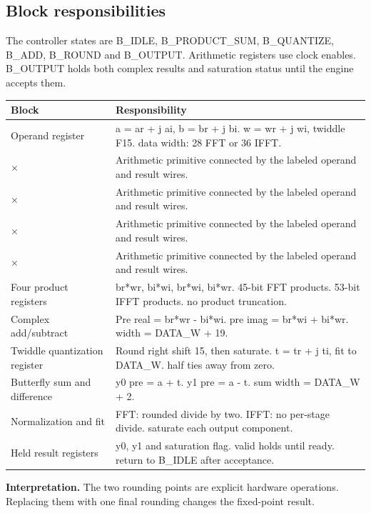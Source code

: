 \documentclass[11pt,letterpaper]{article}
\begin{document}
\subsection*{Block responsibilities}
The controller states are B\_IDLE, B\_PRODUCT\_SUM, B\_QUANTIZE, B\_ADD, B\_ROUND and B\_OUTPUT. Arithmetic registers use clock enables. B\_OUTPUT holds both complex results and saturation status until the engine accepts them.
\par\medskip\noindent
\begin{tabularx}{\linewidth}{@{}>{\raggedright\arraybackslash}p{1.65in}Y@{}}\toprule
\textbf{Block} & \textbf{Responsibility} \\ \midrule
Operand register & a = ar + j ai, b = br + j bi. w = wr + j wi, twiddle F15. data width: 28 FFT or 36 IFFT. \\[5pt]
× & Arithmetic primitive connected by the labeled operand and result wires. \\[5pt]
× & Arithmetic primitive connected by the labeled operand and result wires. \\[5pt]
× & Arithmetic primitive connected by the labeled operand and result wires. \\[5pt]
× & Arithmetic primitive connected by the labeled operand and result wires. \\[5pt]
Four product registers & br*wr, bi*wi, br*wi, bi*wr. 45-bit FFT products. 53-bit IFFT products. no product truncation. \\[5pt]
Complex add/subtract & Pre real = br*wr - bi*wi. pre imag = br*wi + bi*wr. width = DATA\_W + 19. \\[5pt]
Twiddle quantization register & Round right shift 15, then saturate. t = tr + j ti, fit to DATA\_W. half ties away from zero. \\[5pt]
Butterfly sum and difference & y0 pre = a + t. y1 pre = a - t. sum width = DATA\_W + 2. \\[5pt]
Normalization and fit & FFT: rounded divide by two. IFFT: no per-stage divide. saturate each output component. \\[5pt]
Held result registers & y0, y1 and saturation flag. valid holds until ready. return to B\_IDLE after acceptance. \\[5pt]
\bottomrule\end{tabularx}
\vspace{8pt}
\noindent\textbf{Interpretation.} The two rounding points are explicit hardware operations. Replacing them with one final rounding changes the fixed-point result.
\clearpage
\end{document}
